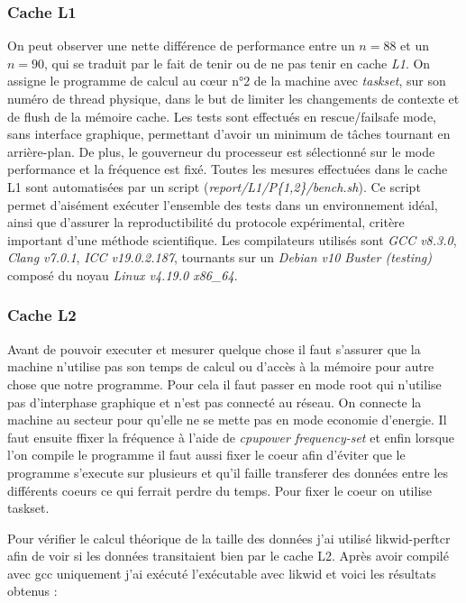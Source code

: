 \documentclass[12pt,a4paper]{article}
\begin{document}
\subsubsection{Cache L1}

On peut observer une nette différence de performance entre un $n = 88$ et un $n
= 90$, qui se traduit par le fait de tenir ou de ne pas tenir en cache
\textit{L1}. On assigne le programme de calcul au cœur n°2 de la machine avec
\textit{taskset}, sur son numéro de thread physique, dans le but de limiter les
changements de contexte et de flush de la mémoire cache. Les tests sont
effectués en rescue/failsafe mode, sans interface graphique, permettant d'avoir
un minimum de tâches tournant en arrière-plan. De plus, le gouverneur du
processeur est sélectionné sur le mode performance et la fréquence est fixé. Toutes
les mesures effectuées dans le cache L1 sont automatisées par un script
(\textit{report/L1/P\{1,2\}/bench.sh}). Ce script permet d'aisément exécuter
l'ensemble des tests dans un environnement idéal, ainsi que d'assurer la
reproductibilité du protocole expérimental, critère important d'une méthode
scientifique. Les compilateurs utilisés sont \textit{GCC v8.3.0}, \textit{Clang
v7.0.1}, \textit{ICC v19.0.2.187}, tournants sur un \textit{Debian v10 Buster
(testing)} composé du noyau \textit{Linux v4.19.0 x86\_64}.

\subsubsection{Cache L2}
Avant de pouvoir executer et mesurer quelque chose il faut s'assurer que 
la machine n'utilise pas son temps de calcul ou d'accès à la mémoire pour 
autre chose que notre programme. Pour cela il faut passer en mode root qui 
n'utilise pas d'interphase graphique et n'est pas connecté au réseau. On 
connecte la machine au secteur pour qu'elle ne se mette pas en mode economie
d'energie. Il faut ensuite ffixer la fréquence à l'aide de \textit{cpupower 
frequency-set} et enfin lorsque l'on compile le programme il faut aussi fixer
le coeur afin d'éviter que le programme s'execute sur plusieurs et qu'il 
faille transferer des données entre les différents coeurs ce qui ferrait 
perdre du temps. Pour fixer le coeur on utilise taskset.

Pour vérifier le calcul théorique de la taille des données j'ai utilisé
likwid-perftcr afin de voir si les données transitaient bien par le cache L2.
Après avoir compilé avec gcc uniquement j'ai exécuté l'exécutable avec likwid et
voici les résultats obtenus :
\end{document}
